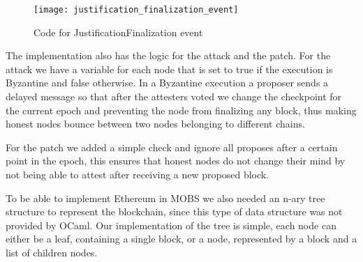 \begin{figure}[h]
	\centering
	\texttt{[image: justification\_finalization\_event]}
	\caption{Code for JustificationFinalization event}
	\label{fig:justification_finalization_event}
\end{figure}


The implementation also has the logic for the attack and the patch. For the attack we have a variable for each node that is set to true
if the execution is Byzantine and false otherwise. In a Byzantine execution a proposer sends a delayed message so that after the attesters
voted we change the checkpoint for the current epoch and preventing the node from finalizing any block, thus making honest nodes bounce between
two nodes belonging to different chains.

For the patch we added a simple check and ignore all proposes after a certain point in the epoch, this ensures that honest nodes do not change their mind
by not being able to attest after receiving a new proposed block.

To be able to implement Ethereum in MOBS we also needed an n-ary tree structure to represent the blockchain, since this type of
data structure was not provided by OCaml. Our implementation of the tree is simple, each node can either be a leaf, containing a single block,
or a node, represented by a block and a list of children nodes.

